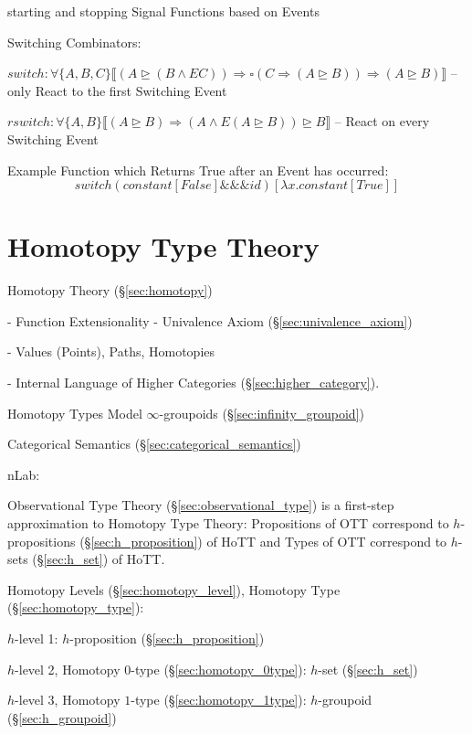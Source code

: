 starting and stopping Signal Functions based on Events

Switching Combinators:

$switch : \forall\{A,B,C\} \llbracket (A \unrhd (B \wedge E C))
  \Rightarrow \square(C \Rightarrow (A \unrhd B))
  \Rightarrow (A \unrhd B) \rrbracket$ -- only React to the first
  Switching Event

$rswitch : \forall\{A,B\} \llbracket (A \unrhd B)
  \Rightarrow (A \wedge E(A \unrhd B)) \unrhd B \rrbracket$ -- React
  on every Switching Event

Example Function which Returns True after an Event has occurred:
\[
  switch(constant[False] \&\&\& id)[\lambda x.constant[True]]
\]



\section{Homotopy Type Theory}\label{sec:hott}

Homotopy Theory (\S\ref{sec:homotopy})

- Function Extensionality
- Univalence Axiom (\S\ref{sec:univalence_axiom})

- Values (Points), Paths, Homotopies

- Internal Language of Higher Categories
(\S\ref{sec:higher_category}).

Homotopy Types Model $\infty$-groupoids
(\S\ref{sec:infinity_groupoid})

Categorical Semantics (\S\ref{sec:categorical_semantics})

nLab:

Observational Type Theory (\S\ref{sec:observational_type}) is a
first-step approximation to Homotopy Type Theory: Propositions of OTT
correspond to $h$-propositions (\S\ref{sec:h_proposition}) of HoTT and
Types of OTT correspond to $h$-sets (\S\ref{sec:h_set}) of HoTT.

Homotopy Levels (\S\ref{sec:homotopy_level}), Homotopy Type
(\S\ref{sec:homotopy_type}):

$h$-level 1: $h$-proposition (\S\ref{sec:h_proposition})

$h$-level 2, Homotopy $0$-type (\S\ref{sec:homotopy_0type}): $h$-set
(\S\ref{sec:h_set})

$h$-level 3, Homotopy $1$-type (\S\ref{sec:homotopy_1type}):
$h$-groupoid (\S\ref{sec:h_groupoid})



